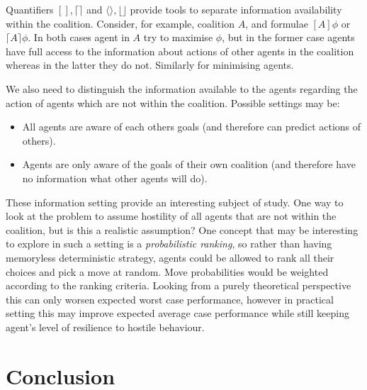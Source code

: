 \documentclass{llncs}
\begin{document}
\begin{remark}
Quantifiers $[], \lceil\rceil$ and $\langle\rangle, \lfloor \rfloor$ provide tools to separate information availability within the coalition. Consider, for example, coalition $A$, and formulae $[A]\phi$ or $\lceil A\rceil\phi$. In both cases agent in $A$ try to maximise $\phi$, but in the former case agents have full access to the information about actions of other agents in the coalition whereas in the latter they do not. Similarly for minimising agents.

We also need to distinguish the information available to the agents regarding the action of  agents which are not within the coalition. Possible settings may be:
\begin{itemize}
 \item All agents are aware of each others goals (and therefore can predict actions of others).
 \item Agents are only aware of the goals of their own coalition (and therefore have no information what other agents will do).
\end{itemize}

These information setting provide an interesting subject of study. One way to look at the problem to assume hostility of all agents that are not within the coalition, but is this a realistic assumption? One concept that may be interesting to explore in such a setting is a \emph{probabilistic ranking}, so rather than having memoryless deterministic strategy, agents could be allowed to rank all their choices and pick a move at random. Move probabilities would be weighted according to the ranking criteria. Looking from a purely theoretical perspective this can only worsen expected worst case performance, however in practical setting this may improve expected average case performance while still keeping agent's level of resilience to hostile behaviour.

\end{remark}

\section{Conclusion}
\end{document}
